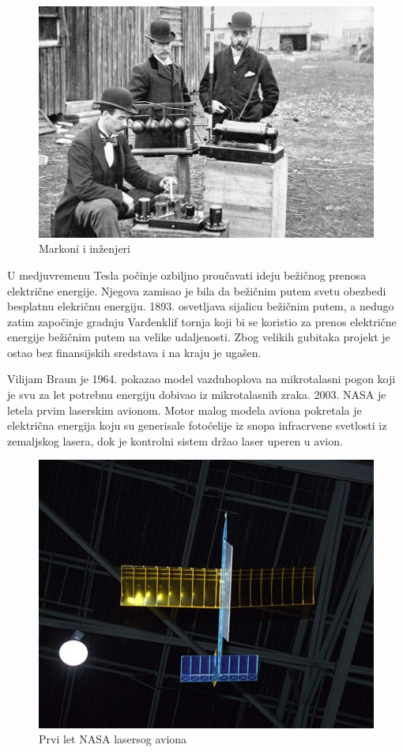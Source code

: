 \documentclass[a4paper]{article}
\begin{document}
\begin{figure}[h!]
    \centering
    \includegraphics[scale=0.2]{Markoni.jpg}
    \caption{Markoni i inženjeri}
    \label{fig:my_labela}
\end{figure}



U medjuvremenu Tesla počinje ozbiljno proučavati ideju bežičnog prenosa električne energije. Njegova zamisao je bila da bežičnim putem svetu obezbedi besplatnu elekričnu energiju. 1893. osvetljava sijalicu bežičnim putem, a nedugo zatim započinje gradnju Vardenklif tornja
koji bi se koristio za prenos električne energije bežičnim putem na velike udaljenosti. Zbog velikih gubitaka projekt je ostao bez finansijskih sredstava i na kraju je ugašen. 

Vilijam Braun je 1964. pokazao model vazduhoplova na mikrotalasni pogon koji je svu
za let potrebnu energiju dobivao iz mikrotalasnih zraka. 
2003. NASA je letela prvim laserskim avionom. Motor malog modela aviona pokretala je električna energija koju su generisale fotoćelije iz snopa infracrvene svetlosti iz zemaljskog lasera, dok je kontrolni sistem držao laser uperen u avion.

\begin{figure}[h!]
    \centering
    \includegraphics[scale=0.4]{aircraft.jpg}
    \caption{Prvi let NASA lasersog aviona}
    \label{fig:my_label}
\end{figure}
\end{document}
